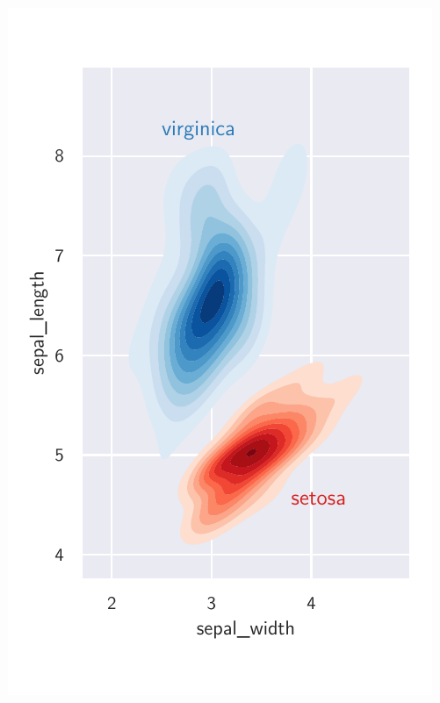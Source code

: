 \documentclass[a4paper,12pt]{quantumarticle}
\begin{document}
\begin{figure}
	\centering
	\includegraphics{iris}
	\caption{\lipsum[3]}
\end{figure}

\lipsum[40-44]
    
\end{document}
